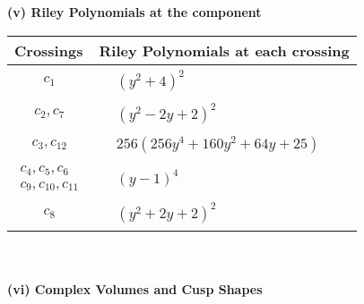 \documentclass[1p]{elsarticle_modified}
\theoremstyle{definition}
\begin{document}
\newpage\renewcommand{\arraystretch}{1}
\flushleft \textbf{(v) Riley Polynomials at the component}\newline \\
\begin{tabular}{m{50pt}|m{274pt}}
Crossings & \hspace{64pt}Riley Polynomials at each crossing \\
\hline $$\begin{aligned}c_{1}\end{aligned}$$&$\begin{aligned}
&(y^2+4)^2
\end{aligned}$\\
\hline $$\begin{aligned}c_{2},c_{7}\end{aligned}$$&$\begin{aligned}
&(y^2-2 y+2)^2
\end{aligned}$\\
\hline $$\begin{aligned}c_{3},c_{12}\end{aligned}$$&$\begin{aligned}
&256(256 y^4+160 y^2+64 y+25)
\end{aligned}$\\
\hline $$\begin{aligned}c_{4},c_{5},c_{6}\\c_{9},c_{10},c_{11}\end{aligned}$$&$\begin{aligned}
&(y-1)^4
\end{aligned}$\\
\hline $$\begin{aligned}c_{8}\end{aligned}$$&$\begin{aligned}
&(y^2+2 y+2)^2
\end{aligned}$\\
\hline
\end{tabular}\\~\\
\newpage\flushleft \textbf{(vi) Complex Volumes and Cusp Shapes}
\end{document}
